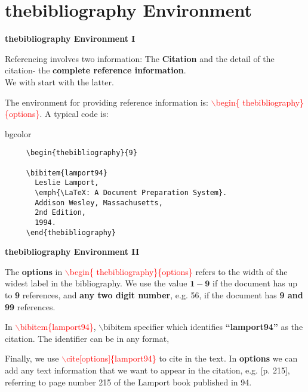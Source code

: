 \section{thebibliography Environment}
\begin{frame}[t,fragile]{\textbf{thebibliography Environment I}}


\justifying
Referencing involves two information: The \textbf{Citation} and the detail of the citation- the \textbf{complete reference information}.\\ We with start with the latter.
\vspace{0.1cm}

The environment for providing reference information is: \textcolor{red}{$\backslash$begin\{ thebibliography\}\{options\}}. A typical code is:\\
\vspace{0.2cm}
\small
\begin{beamercolorbox}[ rounded=true, center, shadow=true,wd=9.5cm]{bgcolor}
      \vspace{-0.5cm}
\begin{verbatim}
     \begin{thebibliography}{9}
   
     \bibitem{lamport94}
       Leslie Lamport,
       \emph{\LaTeX: A Document Preparation System}.
       Addison Wesley, Massachusetts,
       2nd Edition,
       1994.
     \end{thebibliography}
 \end{verbatim}
 \vspace{-0.7cm}
   \end{beamercolorbox}


\end{frame}

\begin{frame}[t,fragile]{\textbf{thebibliography Environment II}}

\justifying


The \textbf{options} in \textcolor{red}{$\backslash$begin\{ thebibliography\}\{options\}} refers to the width of the widest label in the bibliography. We use the value $\mathbf{1-9}$ if the document has up to \textbf{9} references, and\textbf{ any two digit number}, e.g. 56, if the document has \textbf{9 and 99} references.\\
\vspace{0.3cm}

In \textcolor{red}{$\backslash$bibitem\{lamport94\}}, $\backslash$bibitem specifier which identifies \textbf{``lamport94''} as the citation. The identifier can be in any format,\\
\vspace{0.3cm}

Finally, we use \textcolor{red}{$\backslash$cite[options]\{lamport94\}} to cite in the text. In \textbf{options} we can add any text information that we want to appear in the citation, e.g. [p. 215], referring to page number 215 of the Lamport book published in 94.

\end{frame}

